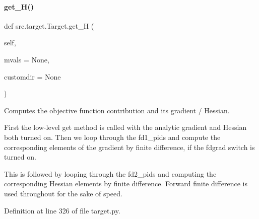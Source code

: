 \paragraph{\texorpdfstring{get\+\_\+\+H()}{get\_H()}}
{\footnotesize\ttfamily def src.\+target.\+Target.\+get\+\_\+H (\begin{DoxyParamCaption}\item[{}]{self,  }\item[{}]{mvals = {\ttfamily None},  }\item[{}]{customdir = {\ttfamily None} }\end{DoxyParamCaption})\hspace{0.3cm}{\ttfamily [inherited]}}



Computes the objective function contribution and its gradient / Hessian. 

First the low-\/level \textquotesingle{}get\textquotesingle{} method is called with the analytic gradient and Hessian both turned on. Then we loop through the fd1\+\_\+pids and compute the corresponding elements of the gradient by finite difference, if the \textquotesingle{}fdgrad\textquotesingle{} switch is turned on.

This is followed by looping through the fd2\+\_\+pids and computing the corresponding Hessian elements by finite difference. Forward finite difference is used throughout for the sake of speed. 

Definition at line 326 of file target.\+py.

